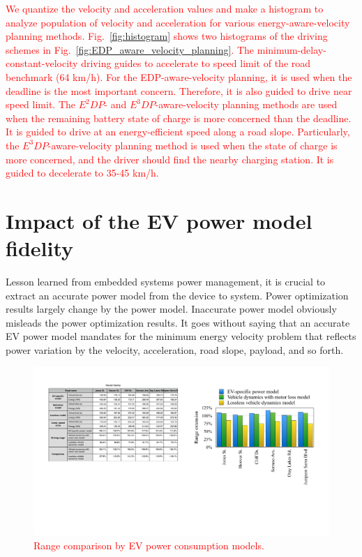 \documentclass{IEEEtran}
\begin{document}
\textcolor{red}{We quantize the velocity and acceleration values and make a histogram to analyze population of velocity and acceleration for various energy-aware-velocity planning methods. Fig.~\ref{fig:histogram} shows two histograms of the driving schemes in Fig.~\ref{fig:EDP_aware_velocity_planning}. The minimum-delay-constant-velocity driving guides to accelerate to speed limit of the road benchmark (64 km/h). For the EDP-aware-velocity planning, it is used when the deadline is the most important concern. Therefore, it is also guided to drive near speed limit. The $E^2DP$- and $E^3DP$-aware-velocity planning methods are used when the remaining battery state of charge is more concerned than the deadline. It is guided to drive at an energy-efficient speed along a road slope. Particularly, the $E^3DP$-aware-velocity planning method is used when the state of charge is more concerned, and the driver should find the nearby charging station. It is guided to decelerate to 35-45 km/h.}\\

\section{Impact of the EV power model fidelity} \label{sec:impact_EV_power model}

Lesson learned from embedded systems power management, it is crucial to extract an accurate power model from the device to system. Power optimization results largely change by the power model. Inaccurate power model obviously misleads the power optimization results. It goes without saying that an accurate EV power model mandates for the minimum energy velocity problem that reflects power variation by the velocity, acceleration, road slope, payload, and so forth.

\begin{figure}	 %
\centering
\includegraphics[width=0.9\hsize]{Figures/model_fidelity.pdf}
\caption{\textcolor{red}{Range comparison by EV power consumption models.}}
\label{fig:energy_by_model}
\end{figure} 
\end{document}
